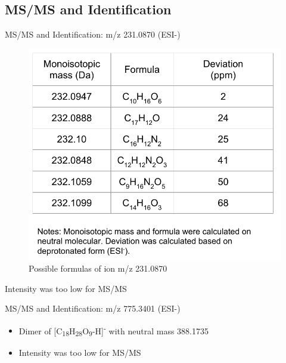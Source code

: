 \documentclass{beamer}
\begin{document}
\subsection{MS/MS and Identification}
\begin{frame}{MS/MS and Identification: m/z 231.0870 (ESI-)}
\begin{figure}[h]
    \centering
    \includegraphics[scale=0.5]{images/231p0870.pdf}
    \caption{Possible formulas of ion m/z 231.0870}
    \label{fig:231p0870}
\end{figure}
\begin{block}{Intensity was too low for MS/MS}
\end{block}
\end{frame}

\begin{frame}{MS/MS and Identification: m/z 775.3401 (ESI-)}

\begin{itemize}
\item Dimer of [C\textsubscript{18}H\textsubscript{28}O\textsubscript{9}-H]\textsuperscript{-} with neutral mass 388.1735

\item Intensity was too low for MS/MS
\end{itemize}
\end{frame}
\end{document}
